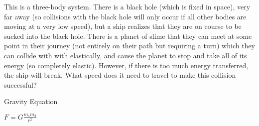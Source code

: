 \documentclass{article}
\begin{document}
This is a three-body system. There is a black hole (which is fixed in space), very far away (so collisions with the black hole will only occur if all other bodies are moving at a very low speed), but a ship realizes that they are on course to be sucked into the black hole. There is a
 planet of slime that they can meet at some point in their journey (not entirely on their path but requiring a turn) which they can collide with with elastically, and cause the planet to stop and take all of its energy (so completely elastic). However, if there is too much energy transferred, the ship will break. What speed does it need to travel to make this collision successful?

Gravity Equation

$F = G\frac{m_1 m_2}{r^2}$
\end{document}

